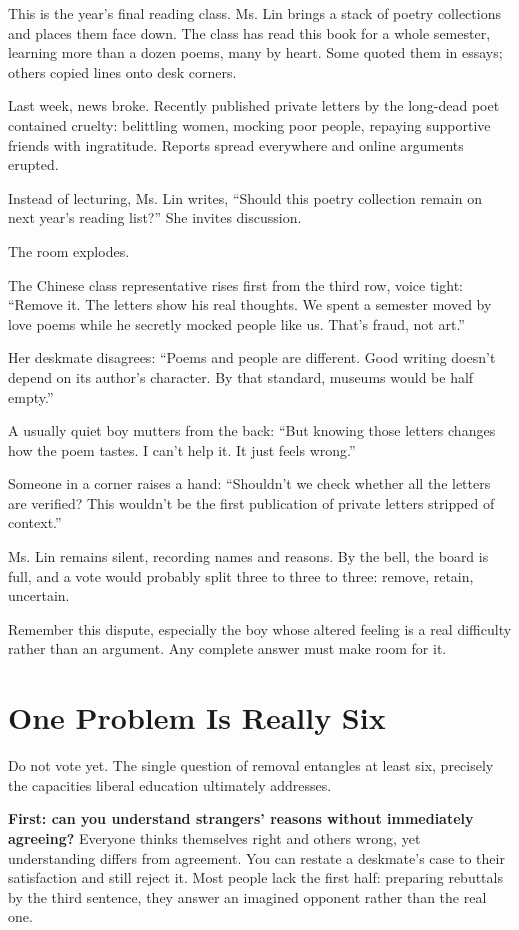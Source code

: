 This is the year's final reading class. Ms. Lin brings a stack of poetry collections and places them face down. The class has read this book for a whole semester, learning more than a dozen poems, many by heart. Some quoted them in essays; others copied lines onto desk corners.

Last week, news broke. Recently published private letters by the long-dead poet contained cruelty: belittling women, mocking poor people, repaying supportive friends with ingratitude. Reports spread everywhere and online arguments erupted.

Instead of lecturing, Ms. Lin writes, ``Should this poetry collection remain on next year's reading list?'' She invites discussion.

The room explodes.

The Chinese class representative rises first from the third row, voice tight: ``Remove it. The letters show his real thoughts. We spent a semester moved by love poems while he secretly mocked people like us. That's fraud, not art.''

Her deskmate disagrees: ``Poems and people are different. Good writing doesn't depend on its author's character. By that standard, museums would be half empty.''

A usually quiet boy mutters from the back: ``But knowing those letters changes how the poem tastes. I can't help it. It just feels wrong.''

Someone in a corner raises a hand: ``Shouldn't we check whether all the letters are verified? This wouldn't be the first publication of private letters stripped of context.''

Ms. Lin remains silent, recording names and reasons. By the bell, the board is full, and a vote would probably split three to three to three: remove, retain, uncertain.

Remember this dispute, especially the boy whose altered feeling is a real difficulty rather than an argument. Any complete answer must make room for it.

\section{One Problem Is Really Six}
Do not vote yet. The single question of removal entangles at least six, precisely the capacities liberal education ultimately addresses.

\textbf{First: can you understand strangers' reasons without immediately agreeing?} Everyone thinks themselves right and others wrong, yet understanding differs from agreement. You can restate a deskmate's case to their satisfaction and still reject it. Most people lack the first half: preparing rebuttals by the third sentence, they answer an imagined opponent rather than the real one.

